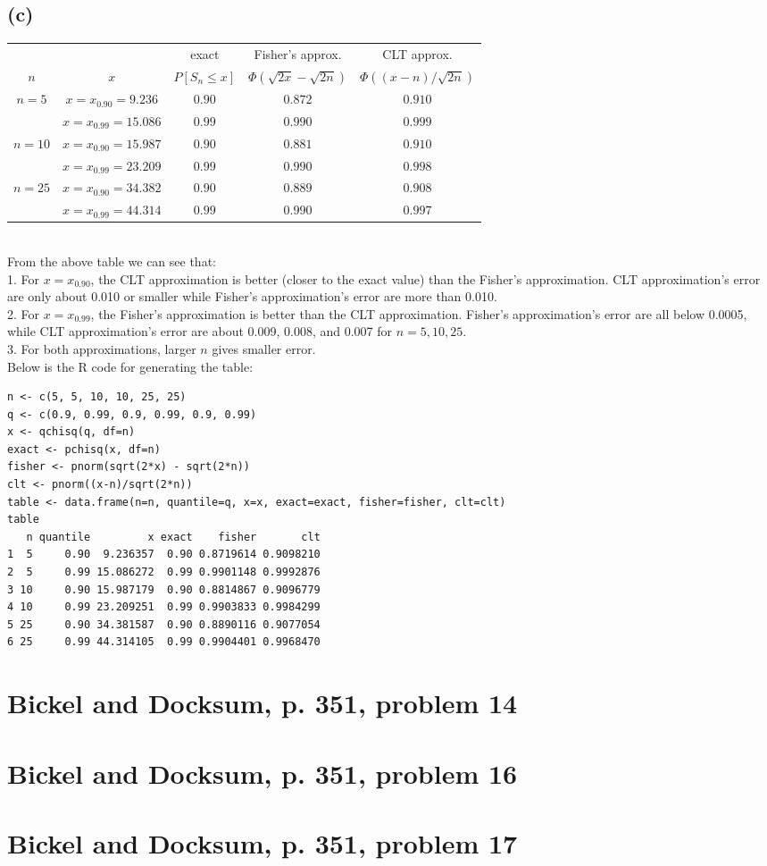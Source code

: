 \subsection*{(c)}
\begin{tabular}{|c|c|c|c|c|}
\hline
& & exact & Fisher's approx. & CLT approx.\\
$n$ & $x$ & $P[S_n \leq x]$ & $\Phi(\sqrt{2x}-\sqrt{2n})$ & $\Phi((x-n)/\sqrt{2n})$ \\
\hline
$n=5$ & $x=x_{0.90}=9.236$ & $0.90$ & $0.872$ & $0.910$ \\
\cline{2-5}
& $x=x_{0.99}=15.086$ & $0.99$ & $0.990$ & $0.999$ \\
\hline
$n=10$ & $x=x_{0.90}=15.987$ & $0.90$ & $0.881$ & $0.910$ \\
\cline{2-5}
& $x=x_{0.99}=23.209$ & $0.99$ & $0.990$ & $0.998$ \\
\hline
$n=25$ & $x=x_{0.90}=34.382$ & $0.90$ & $0.889$ & $0.908$ \\
\cline{2-5}
& $x=x_{0.99}=44.314$ & $0.99$ & $0.990$ & $0.997$ \\
\hline
\end{tabular}
\\
From the above table we can see that: \\
1. For $x=x_{0.90}$, the CLT approximation is better (closer to the exact value) than the Fisher's approximation. CLT approximation's error are only about 0.010 or smaller while Fisher's approximation's error are more than 0.010. \\
2. For $x=x_{0.99}$, the Fisher's approximation is better than the CLT approximation. Fisher's approximation's error are all below 0.0005, while CLT approximation's error are about 0.009, 0.008, and 0.007 for $n=5, 10, 25$. \\
3. For both approximations, larger $n$ gives smaller error.\\
Below is the R code for generating the table:
\begin{lstlisting}
n <- c(5, 5, 10, 10, 25, 25)
q <- c(0.9, 0.99, 0.9, 0.99, 0.9, 0.99)
x <- qchisq(q, df=n)
exact <- pchisq(x, df=n)
fisher <- pnorm(sqrt(2*x) - sqrt(2*n))
clt <- pnorm((x-n)/sqrt(2*n))
table <- data.frame(n=n, quantile=q, x=x, exact=exact, fisher=fisher, clt=clt)
table
   n quantile         x exact    fisher       clt
1  5     0.90  9.236357  0.90 0.8719614 0.9098210
2  5     0.99 15.086272  0.99 0.9901148 0.9992876
3 10     0.90 15.987179  0.90 0.8814867 0.9096779
4 10     0.99 23.209251  0.99 0.9903833 0.9984299
5 25     0.90 34.381587  0.90 0.8890116 0.9077054
6 25     0.99 44.314105  0.99 0.9904401 0.9968470
\end{lstlisting}

\section{Bickel and Docksum, p. 351, problem 14}

\section{Bickel and Docksum, p. 351, problem 16}

\section{Bickel and Docksum, p. 351, problem 17}


